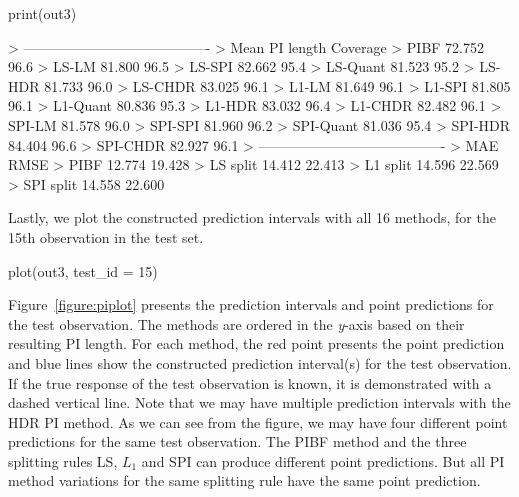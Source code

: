 \begin{example*}
print(out3)

> ---------------------------------------- 
>              Mean PI length    Coverage
> PIBF             72.752          96.6%
> LS-LM            81.800          96.5%
> LS-SPI           82.662          95.4%
> LS-Quant         81.523          95.2%
> LS-HDR           81.733          96.0%
> LS-CHDR          83.025          96.1%
> L1-LM            81.649          96.1%
> L1-SPI           81.805          96.1%
> L1-Quant         80.836          95.3%
> L1-HDR           83.032          96.4%
> L1-CHDR          82.482          96.1%
> SPI-LM           81.578          96.0%
> SPI-SPI          81.960          96.2%
> SPI-Quant        81.036          95.4%
> SPI-HDR          84.404          96.6%
> SPI-CHDR         82.927          96.1%
> ---------------------------------------- 
>                    MAE            RMSE
> PIBF             12.774         19.428
> LS split         14.412         22.413
> L1 split         14.596         22.569
> SPI split        14.558         22.600
\end{example*}

Lastly, we plot the constructed prediction intervals with all 16 methods, for the 15th observation in the test set.

\begin{example*}
plot(out3, test_id = 15)
\end{example*}

Figure~\ref{figure:piplot} presents the prediction intervals and point predictions for the test observation. The methods are ordered in the \emph{y}-axis based on their resulting PI length. For each method, the red point presents the point prediction and blue lines show the constructed prediction interval(s) for the test observation. If the true response of the test observation is known, it is demonstrated with a dashed vertical line. Note that we may have multiple prediction intervals with the HDR PI method. As we can see from the figure, we may have four different point predictions for the same test observation. The PIBF method and the three splitting rules LS, $L_1$ and SPI can produce different point predictions. But all PI method variations for the same splitting rule have the same point prediction. 

